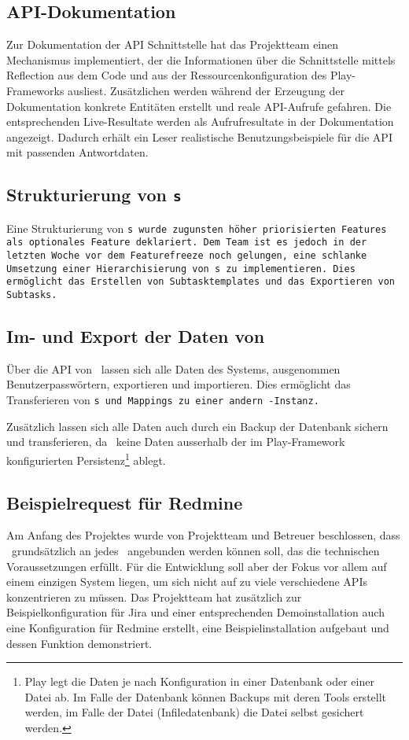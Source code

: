 		\subsection{API-Dokumentation}
			Zur Dokumentation der API Schnittstelle hat das Projektteam
			einen Mechanismus implementiert, der die Informationen über die Schnittstelle mittels Reflection aus dem Code und aus der Ressourcenkonfiguration des Play-Frameworks ausliest.
			Zusätzlichen werden während der Erzeugung der Dokumentation konkrete Entitäten erstellt und reale API-Aufrufe gefahren.
			Die entsprechenden Live-Resultate werden als Aufrufresultate in der Dokumentation angezeigt.
			Dadurch erhält ein Leser realistische Benutzungsbeispiele für die API mit passenden Antwortdaten.
			
	
		\subsection{Strukturierung von \tt s}
			Eine Strukturierung von \tt s wurde zugunsten höher priorisierten Features als optionales Feature deklariert.
			Dem Team ist es jedoch in der letzten Woche vor dem Featurefreeze noch gelungen, eine schlanke Umsetzung einer Hierarchisierung von \tt s zu implementieren.
			Dies ermöglicht das Erstellen von Subtasktemplates und das Exportieren von Subtasks.
			
		
		\subsection{Im- und Export der Daten von \eeppi}
			Über die API von \eeppi\ lassen sich alle Daten des Systems,
			ausgenommen Benutzerpasswörtern, exportieren und importieren.
			Dies ermöglicht das Transferieren von \tt s und Mappings zu einer andern \eeppi -Instanz.
			
			Zusätzlich lassen sich alle Daten auch durch ein Backup der Datenbank sichern und transferieren, da \eeppi\ keine Daten ausserhalb der im Play-Framework konfigurierten Persistenz\footnote{Play legt die Daten je nach Konfiguration in einer Datenbank oder einer Datei ab. Im Falle der Datenbank können Backups mit deren Tools erstellt werden, im Falle der Datei (Infiledatenbank) die Datei selbst gesichert werden.} ablegt.
			
			
		\subsection{Beispielrequest für Redmine}
			Am Anfang des Projektes wurde von Projektteam und Betreuer beschlossen, 
			dass \eeppi\ grundsätzlich an jedes \ppt\ angebunden werden können soll, das die technischen Voraussetzungen erfüllt.
			Für die Entwicklung soll aber der Fokus vor allem auf einem einzigen System liegen, um sich nicht auf zu viele verschiedene APIs konzentrieren zu müssen.
			Das Projektteam hat zusätzlich zur Beispielkonfiguration für Jira und einer entsprechenden Demoinstallation auch eine Konfiguration für Redmine erstellt, eine Beispielinstallation aufgebaut und dessen Funktion demonstriert.
	
